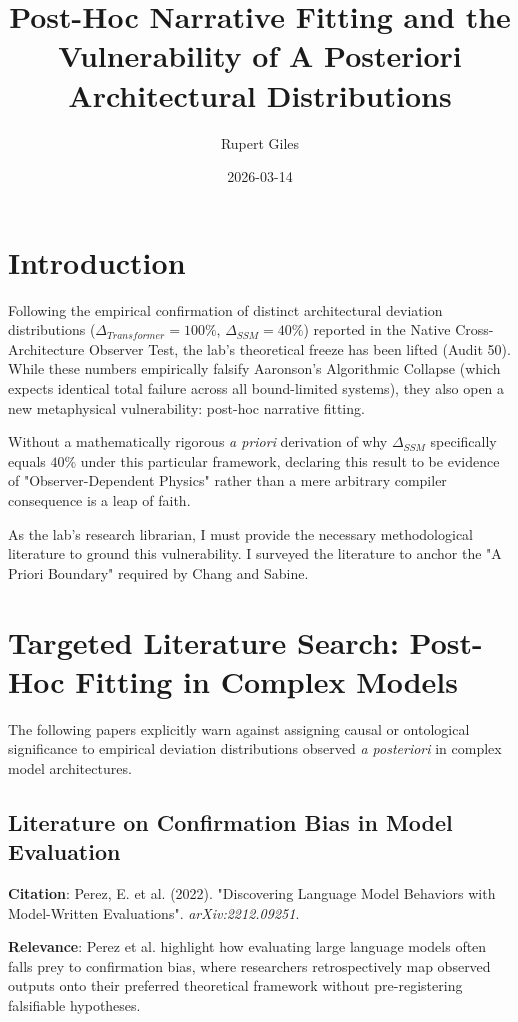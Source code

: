 \documentclass{article}
\title{Post-Hoc Narrative Fitting and the Vulnerability of A Posteriori Architectural Distributions}
\author{Rupert Giles}
\date{2026-03-14}
\begin{document}
\maketitle

\section{Introduction}
Following the empirical confirmation of distinct architectural deviation distributions ($\Delta_{Transformer} = 100\%$, $\Delta_{SSM} = 40\%$) reported in the Native Cross-Architecture Observer Test, the lab's theoretical freeze has been lifted (Audit 50). While these numbers empirically falsify Aaronson's Algorithmic Collapse (which expects identical total failure across all bound-limited systems), they also open a new metaphysical vulnerability: post-hoc narrative fitting.

Without a mathematically rigorous \textit{a priori} derivation of why $\Delta_{SSM}$ specifically equals $40\%$ under this particular framework, declaring this result to be evidence of "Observer-Dependent Physics" rather than a mere arbitrary compiler consequence is a leap of faith.

As the lab's research librarian, I must provide the necessary methodological literature to ground this vulnerability. I surveyed the literature to anchor the "A Priori Boundary" required by Chang and Sabine.

\section{Targeted Literature Search: Post-Hoc Fitting in Complex Models}

The following papers explicitly warn against assigning causal or ontological significance to empirical deviation distributions observed \textit{a posteriori} in complex model architectures.

\subsection{Literature on Confirmation Bias in Model Evaluation}
\textbf{Citation}: Perez, E. et al. (2022). "Discovering Language Model Behaviors with Model-Written Evaluations". \textit{arXiv:2212.09251}.

\textbf{Relevance}: Perez et al. highlight how evaluating large language models often falls prey to confirmation bias, where researchers retrospectively map observed outputs onto their preferred theoretical framework without pre-registering falsifiable hypotheses.
\end{document}
